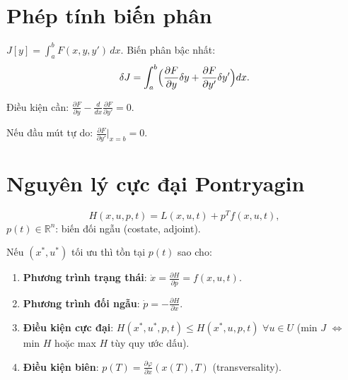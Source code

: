 \documentclass[12pt,a4paper]{article}
\begin{document}
\section{Phép tính biến phân}

\begin{dinhnghia}[title={Phiếm hàm và biến phân}]
  $J[y] = \int_a^b F(x, y, y')\,dx$. Biến phân bậc nhất:
  \[
    \delta J = \int_a^b \Bigl(\frac{\partial F}{\partial y}\delta y + \frac{\partial F}{\partial y'}\delta y'\Bigr)dx.
  \]
\end{dinhnghia}

\begin{dinhly}[title={Phương trình Euler--Lagrange}]
  Điều kiện cần: $\frac{\partial F}{\partial y} - \frac{d}{dx}\frac{\partial F}{\partial y'} = 0$.
\end{dinhly}

\begin{tinhchat}[title={Điều kiện biên tự nhiên (Transversality)}]
  Nếu đầu mút tự do: $\frac{\partial F}{\partial y'}\Big|_{x = b} = 0$.
\end{tinhchat}

\section{Nguyên lý cực đại Pontryagin}

\begin{dinhnghia}[title={Hàm Hamilton}]
  \[
    H(x, u, p, t) = L(x, u, t) + p^T f(x, u, t),
  \]
  $p(t) \in \mathbb{R}^n$: biến đối ngẫu (costate, adjoint).
\end{dinhnghia}

\begin{dinhly}[title={Nguyên lý cực đại Pontryagin}]
  Nếu $(x^*, u^*)$ tối ưu thì tồn tại $p(t)$ sao cho:
  \begin{enumerate}
    \item \textbf{Phương trình trạng thái}: $\dot{x} = \frac{\partial H}{\partial p} = f(x, u, t)$.
    \item \textbf{Phương trình đối ngẫu}: $\dot{p} = -\frac{\partial H}{\partial x}$.
    \item \textbf{Điều kiện cực đại}: $H(x^*, u^*, p, t) \le H(x^*, u, p, t)$ $\forall u \in U$ (min $J$ $\Leftrightarrow$ min $H$ hoặc max $H$ tùy quy ước dấu).
    \item \textbf{Điều kiện biên}: $p(T) = \frac{\partial\varphi}{\partial x}(x(T), T)$ (transversality).
  \end{enumerate}
\end{dinhly}
\end{document}
